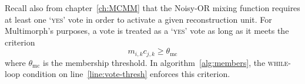  Recall also from chapter~\ref{ch:MCMM} that 
the
 Noisy-OR mixing function requires at least one `\textsc{yes}' vote 
 in order to activate a given reconstruction unit.
 For Multimorph's 
 purposes, a vote is treated as a `\textsc{yes}' vote as long as it meets 
 the criterion 
 \begin{equation}\label{eq:vote-criterion}
 m_{i,k}c_{j,k} \geq \theta_{\text{mc}}
 \end{equation}
 where $\theta_{\text{mc}}$ is the membership threshold. 
 In algorithm~\ref{alg:members}, the \textsc{while}-loop condition on line~\ref{line:vote-thresh} enforces this criterion. 
 

